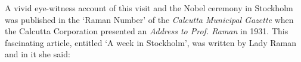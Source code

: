 
\medskip
{}
\smallskip


\noindent
A vivid eye-witness account of this visit and the Nobel
ceremony in Stockholm was published in the `Raman Number'
of the {\em Calcutta Municipal Gazette} when the Calcutta Corporation
presented an {\em Address to Prof. Raman} in 1931. This fascinating
article, entitled `A week in Stockholm', was written by Lady
Raman and in it she said:
